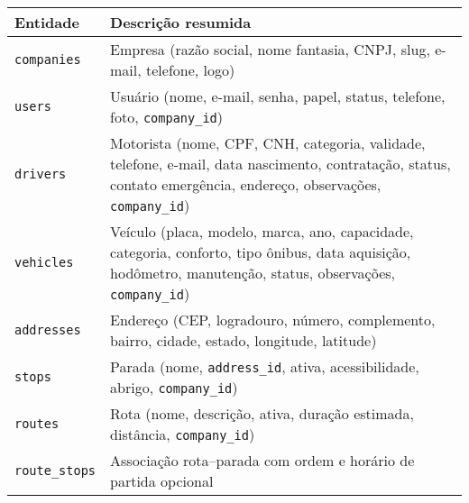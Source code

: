 \begin{table}[H]
  \small
  \centering
  \begin{tabular}{|p{3.5cm}|p{11.5cm}|}
    \hline
    \textbf{Entidade}         & \textbf{Descrição resumida}                                                                                                                                                                    \\
    \hline
    \texttt{companies}        & Empresa (razão social, nome fantasia, CNPJ, slug, e-mail, telefone, logo)                                                                                                                      \\
    \hline
    \texttt{users}            & Usuário (nome, e-mail, senha, papel, status, telefone, foto,                                                                                                             \texttt{company\_id}) \\
    \hline
    \texttt{drivers}          & Motorista (nome, CPF, CNH, categoria, validade, telefone, e-mail, data nascimento, contratação, status, contato emergência, endereço, observações, \texttt{company\_id})                       \\
    \hline
    \texttt{vehicles}         & Veículo (placa, modelo, marca, ano, capacidade, categoria, conforto, tipo ônibus, data aquisição, hodômetro, manutenção, status, observações, \texttt{company\_id})                            \\
    \hline
    \texttt{addresses}        & Endereço (CEP, logradouro, número, complemento, bairro, cidade, estado, longitude, latitude)                                                                                                   \\
    \hline
    \texttt{stops}            & Parada (nome, \texttt{address\_id}, ativa, acessibilidade, abrigo, \texttt{company\_id})                                                                                                       \\
    \hline
    \texttt{routes}           & Rota (nome, descrição, ativa, duração estimada, distância, \texttt{company\_id})                                                                                                               \\
    \hline
    \texttt{route\_stops}     & Associação rota–parada com ordem e horário de partida opcional                                                                                                                                 \\

\end{tabular}
\end{table}
